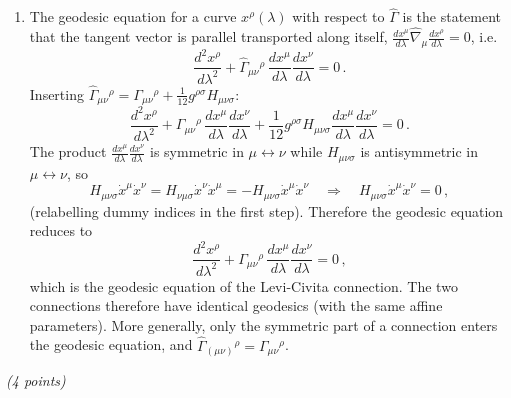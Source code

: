 \documentclass[12pt]{article}
\newcommand{\be}{\begin{equation}}
\newcommand{\ee}{\end{equation}}
\newcounter{quesno}
\newcommand{\ques}[1]{\vspace{2em}\stepcounter{quesno}
\noindent{\bf Question \thequesno.} \emph{(#1 points)}\par\medskip}
\begin{document}
\begin{enumerate}[label=\alph*)]
So $\hat\Gamma$ is a metric-compatible connection with totally antisymmetric torsion; it differs from the
unique torsion-free metric-compatible (Levi-Civita) connection precisely by having torsion.

\item The geodesic equation for a curve $x^\rho(\lambda)$ with respect to $\hat\Gamma$ is the statement that the tangent
vector is parallel transported along itself, $\frac{dx^\mu}{d\lambda}\hat\nabla_\mu \frac{dx^\rho}{d\lambda}=0$, i.e.
\be
\frac{d^2x^\rho}{d\lambda^2} + \hat\Gamma_{\mu\nu}{}^\rho\,\frac{dx^\mu}{d\lambda}\frac{dx^\nu}{d\lambda} = 0\,.
\ee
Inserting $\hat\Gamma_{\mu\nu}{}^\rho = \Gamma_{\mu\nu}{}^\rho + \frac1{12}g^{\rho\sigma}H_{\mu\nu\sigma}$:
\be
\frac{d^2x^\rho}{d\lambda^2} + \Gamma_{\mu\nu}{}^\rho\,\frac{dx^\mu}{d\lambda}\frac{dx^\nu}{d\lambda}
+ \frac{1}{12} g^{\rho\sigma} H_{\mu\nu\sigma}\frac{dx^\mu}{d\lambda}\frac{dx^\nu}{d\lambda} = 0\,.
\ee
The product $\frac{dx^\mu}{d\lambda}\frac{dx^\nu}{d\lambda}$ is symmetric in $\mu\leftrightarrow\nu$ while $H_{\mu\nu\sigma}$
is antisymmetric in $\mu\leftrightarrow\nu$, so
\be
H_{\mu\nu\sigma}\dot x^\mu\dot x^\nu = H_{\nu\mu\sigma}\dot x^\nu\dot x^\mu = -H_{\mu\nu\sigma}\dot x^\mu\dot x^\nu
\quad\Rightarrow\quad H_{\mu\nu\sigma}\dot x^\mu\dot x^\nu = 0 \,,
\ee
(relabelling dummy indices in the first step). Therefore the geodesic equation reduces to
\be
\frac{d^2x^\rho}{d\lambda^2} + \Gamma_{\mu\nu}{}^\rho\,\frac{dx^\mu}{d\lambda}\frac{dx^\nu}{d\lambda} = 0\,,
\ee
which is the geodesic equation of the Levi-Civita connection. The two connections therefore have identical
geodesics (with the same affine parameters). More generally, only the symmetric part of a connection enters the
geodesic equation, and $\hat\Gamma_{(\mu\nu)}{}^\rho = \Gamma_{\mu\nu}{}^\rho$.
\end{enumerate}

\ques{4}
\end{document}
